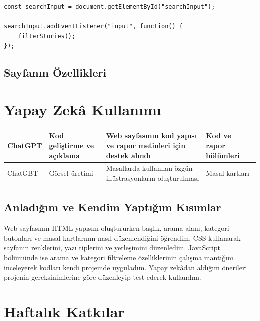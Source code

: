 \documentclass[12pt,a4paper]{article}
\begin{document}
\begin{lstlisting}[caption={İçsel JavaScript'ten önemli bir bölüm}]
const searchInput = document.getElementById("searchInput");

searchInput.addEventListener("input", function() {
    filterStories();
});
\end{lstlisting}

\subsection{Sayfanın Özellikleri}


\section{Yapay Zekâ Kullanımı}


\begin{longtable}{@{}p{2.6cm}p{3.6cm}p{4.2cm}p{3.4cm}@{}}
\toprule
ChatGPT & Kod geliştirme ve açıklama & Web sayfasının kod yapısı ve rapor metinleri için destek alındı & Kod ve rapor bölümleri \\
\midrule

ChatGBT & Görsel üretimi & Masallarda kullanılan özgün illüstrasyonların oluşturulması & Masal kartları \\
\bottomrule
\end{longtable}

\subsection{Anladığım ve Kendim Yaptığım Kısımlar}

Web sayfasının HTML yapısını oluştururken başlık, arama alanı, kategori butonları ve masal kartlarının nasıl düzenlendiğini öğrendim. CSS kullanarak sayfanın renklerini, yazı tiplerini ve yerleşimini düzenledim. JavaScript bölümünde ise arama ve kategori filtreleme özelliklerinin çalışma mantığını inceleyerek kodları kendi projemde uyguladım. Yapay zekâdan aldığım önerileri projenin gereksinimlerine göre düzenleyip test ederek kullandım.

\section{Haftalık Katkılar}
\end{document}
